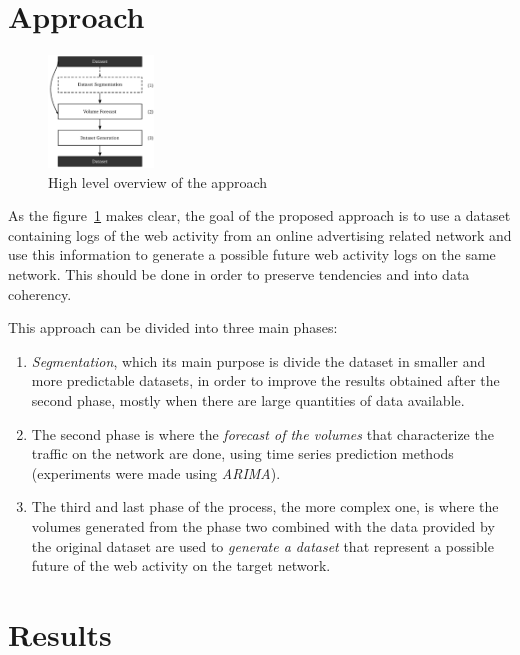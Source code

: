 \documentclass[9pt,a4paper]{extarticle}
\begin{document}
\begin{multicols}{2}
\section{Approach}

\begin{figure}[H]
\centering
\includegraphics[width=0.25\textwidth]{high_level} \caption{ High level overview
of the approach } \label{fig:highlevel_arch} \end{figure}

As the figure~\ref{fig:highlevel_arch} makes clear, the goal of the
proposed approach is to use a dataset containing logs of the web
activity from an online advertising related network and use this information 
to generate a possible future web activity logs on the same network. 
This should be done in order to preserve tendencies and into data coherency.

This approach can be divided into three main phases:
\begin{enumerate}
\item \emph{Segmentation},
which its main purpose is divide the dataset in smaller and more predictable
datasets, in order to improve the results obtained after the second phase, mostly when there
are large quantities of data available.

\item The second phase is where the \emph{forecast of the volumes} that characterize the traffic on
  the network are done, using time series prediction methods (experiments were
  made using \emph{ARIMA}).

\item The third and last phase of the process, the more complex one, is where the volumes
generated from the phase two combined with the data provided by the original
dataset are used to \emph{generate a dataset} that represent a possible future of the
web activity on the target network.
\end{enumerate}

\section{Results}


\end{multicols}
\end{document}
